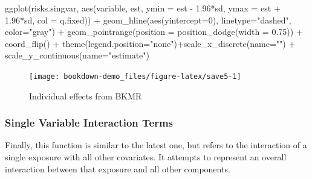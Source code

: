 \documentclass[
]{book}
\newenvironment{Shaded}{\begin{snugshade}}{\end{snugshade}}
\newcommand{\AttributeTok}[1]{\textcolor[rgb]{0.77,0.63,0.00}{#1}}
\newcommand{\DecValTok}[1]{\textcolor[rgb]{0.00,0.00,0.81}{#1}}
\newcommand{\FloatTok}[1]{\textcolor[rgb]{0.00,0.00,0.81}{#1}}
\newcommand{\FunctionTok}[1]{\textcolor[rgb]{0.00,0.00,0.00}{#1}}
\newcommand{\NormalTok}[1]{#1}
\newcommand{\SpecialCharTok}[1]{\textcolor[rgb]{0.00,0.00,0.00}{#1}}
\newcommand{\StringTok}[1]{\textcolor[rgb]{0.31,0.60,0.02}{#1}}
\begin{document}
\begin{Shaded}
\begin{Highlighting}[]
\FunctionTok{ggplot}\NormalTok{(risks.singvar, }\FunctionTok{aes}\NormalTok{(variable, est, }\AttributeTok{ymin =}\NormalTok{ est }\SpecialCharTok{{-}} \FloatTok{1.96}\SpecialCharTok{*}\NormalTok{sd,  }\AttributeTok{ymax =}\NormalTok{ est }\SpecialCharTok{+} \FloatTok{1.96}\SpecialCharTok{*}\NormalTok{sd, }
       \AttributeTok{col =}\NormalTok{ q.fixed)) }\SpecialCharTok{+} \FunctionTok{geom\_hline}\NormalTok{(}\FunctionTok{aes}\NormalTok{(}\AttributeTok{yintercept=}\DecValTok{0}\NormalTok{), }\AttributeTok{linetype=}\StringTok{"dashed"}\NormalTok{, }
       \AttributeTok{color=}\StringTok{"gray"}\NormalTok{) }\SpecialCharTok{+}  \FunctionTok{geom\_pointrange}\NormalTok{(}\AttributeTok{position =} \FunctionTok{position\_dodge}\NormalTok{(}\AttributeTok{width =} \FloatTok{0.75}\NormalTok{)) }\SpecialCharTok{+}
       \FunctionTok{coord\_flip}\NormalTok{() }\SpecialCharTok{+} \FunctionTok{theme}\NormalTok{(}\AttributeTok{legend.position=}\StringTok{"none"}\NormalTok{)}\SpecialCharTok{+}\FunctionTok{scale\_x\_discrete}\NormalTok{(}\AttributeTok{name=}\StringTok{""}\NormalTok{) }\SpecialCharTok{+}
       \FunctionTok{scale\_y\_continuous}\NormalTok{(}\AttributeTok{name=}\StringTok{"estimate"}\NormalTok{) }
\end{Highlighting}
\end{Shaded}

\begin{figure}[H]

{\centering \texttt{[image: bookdown-demo\_files/figure-latex/save5-1]} 

}

\caption{Individual effects from BKMR}\label{fig:save5}
\end{figure}

\hypertarget{single-variable-interaction-terms}{%
\subsubsection{Single Variable Interaction Terms}\label{single-variable-interaction-terms}}

Finally, this function is similar to the latest one, but refers to the interaction of a single exposure with all other covariates. It attempts to represent an overall interaction between that exposure and all other components.
\end{document}
